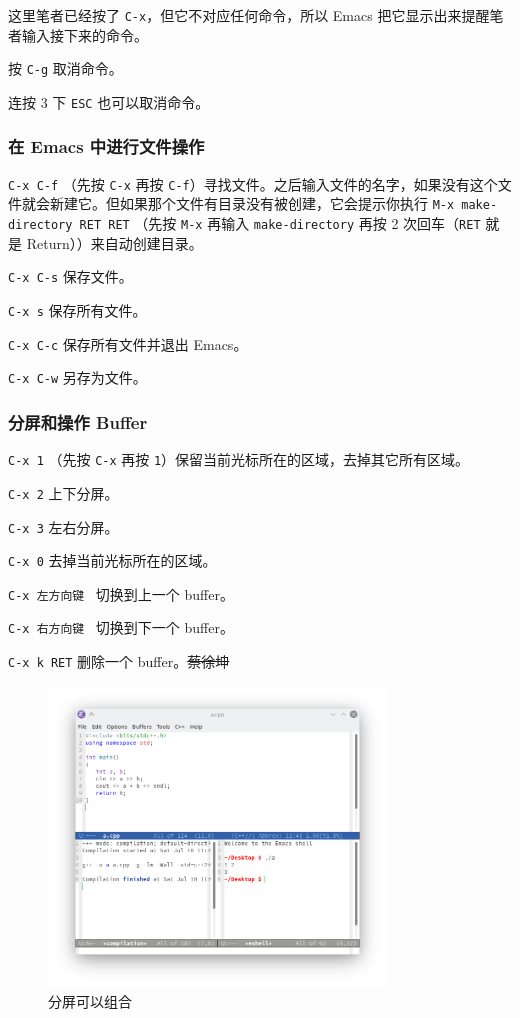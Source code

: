 \documentclass[UTF-8]{ctexart}
\begin{document}
				这里笔者已经按了 \texttt{C-x}，但它不对应任何命令，所以 Emacs 把它显示出来提醒笔者输入接下来的命令。
				
				按 \texttt{C-g} 取消命令。
				
				连按 3 下 \texttt{ESC} 也可以取消命令。
				
			\subsubsection{在 Emacs 中进行文件操作}
			
				\texttt{C-x C-f} （先按 \texttt{C-x} 再按 \texttt{C-f}）寻找文件。之后输入文件的名字，如果没有这个文件就会新建它。但如果那个文件有目录没有被创建，它会提示你执行 \texttt{M-x make-directory RET RET} （先按 \texttt{M-x} 再输入 \texttt{make-directory} 再按 2 次回车（\texttt{RET} 就是 Return））来自动创建目录。
				
				\texttt{C-x C-s} 保存文件。
				
				\texttt{C-x s} 保存所有文件。
				
				\texttt{C-x C-c} 保存所有文件并退出 Emacs。
				
				\texttt{C-x C-w} 另存为文件。
			
			\subsubsection{分屏和操作 Buffer}
				
				\texttt{C-x 1} （先按 \texttt{C-x} 再按 \texttt{1}）保留当前光标所在的区域，去掉其它所有区域。
				
				\texttt{C-x 2} 上下分屏。
				
				\texttt{C-x 3} 左右分屏。
				
				\texttt{C-x 0} 去掉当前光标所在的区域。
				
				\texttt{C-x 左方向键} ~切换到上一个 buffer。
				
				\texttt{C-x 右方向键} ~切换到下一个 buffer。
				
				\texttt{C-x k RET} 删除一个 buffer。\sout{蔡徐坤}
				
				\begin{figure}[H]
					\centering
					\includegraphics[width=0.8\textwidth]{fig/emacs_teach_split.png}
					\caption*{分屏可以组合}
				\end{figure}
			
\end{document}
